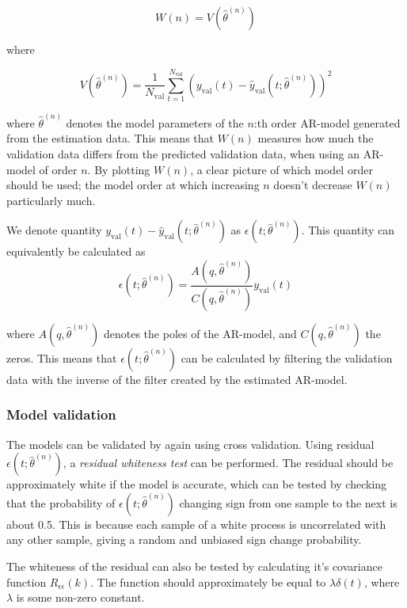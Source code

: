 \documentclass{IEEEtran}
\newcommand{\val}[1]{#1_{\text{val}}}
\begin{document}
\begin{equation}
    W(n) = V(\hat{\theta}^{(n)})
\end{equation}

where

\begin{equation}
    V(\hat{\theta}^{(n)}) = \frac{1}{\val{N}}\sum^{\val{N}}_{t=1}(\val{y}(t) -
        \val{\hat{y}}(t;\hat{\theta}^{(n)}))^2
\end{equation}

where $\hat{\theta}^{(n)}$ denotes the model parameters of the $n$:th order
AR-model generated from the estimation data. This means that $W(n)$ measures
how much the validation data differs from the predicted validation data, when
using an AR-model of order $n$. By plotting $W(n)$, a
clear picture of which model order should be used; the model order at which
increasing $n$ doesn't decrease $W(n)$ particularly much.

We denote quantity $\val{y}(t) - \val{\hat{y}}(t;\hat{\theta}^{(n)})$ as
$\epsilon(t;\hat{\theta}^{(n)})$. This quantity can equivalently be calculated
as
\begin{equation}
    \epsilon(t;\hat{\theta}^{(n)}) =
    \frac{A(q,\hat{\theta}^{(n)})}{C(q,\hat{\theta}^{(n)})}\val{y}(t)
\end{equation}

where $A(q,\hat{\theta}^{(n)})$ denotes the poles of the AR-model, and
$C(q,\hat{\theta}^{(n)})$ the zeros. This means that
$\epsilon(t;\hat{\theta}^{(n)})$ can be calculated by filtering the validation
data with the inverse of the filter created by the estimated AR-model.

\subsubsection{Model validation}
\label{ssub:modelvalidation}
The models can be validated by again using cross validation. Using residual
$\epsilon(t;\hat{\theta}^{(n)})$, a \textit{residual whiteness test} can be
performed. The residual should be approximately white if the model is accurate,
which can be tested by checking that the probability of
$\epsilon(t;\hat{\theta}^{(n)})$ changing sign from one sample to the next is
about 0.5. This is because each sample of a white process is uncorrelated with
any other sample, giving a random and unbiased sign change probability.

The whiteness of the residual can also be tested by calculating it's covariance
function $R_{\epsilon\epsilon}(k)$. The function should approximately be equal
to $\lambda\delta(t)$, where $\lambda$ is some non-zero constant.
\end{document}
